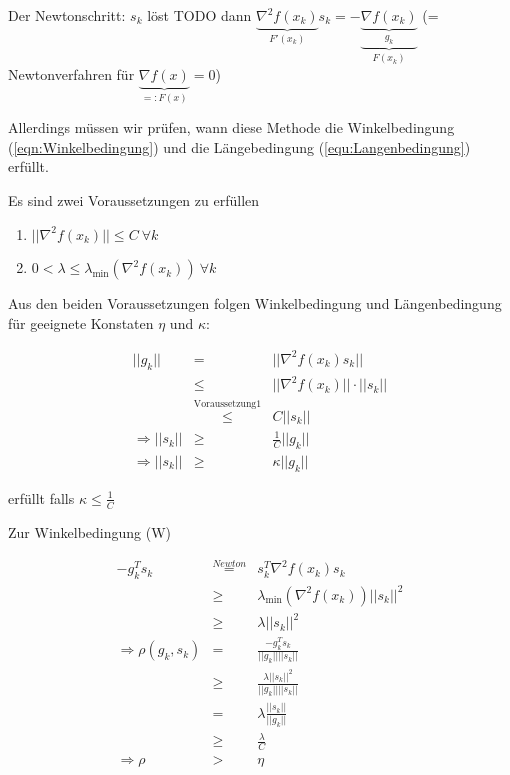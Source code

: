 \documentclass[10pt,a4paper]{article}
\begin{document}




Der Newtonschritt: $s_k$ löst TODO dann $\underbrace{\nabla^{2}f(x_k)}_{F'(x_k)}s_k=-\underbrace{\underbrace{\nabla f(x_k)}_{g_k}}_{F(x_k)}$ (= Newtonverfahren für $\underbrace{\nabla f(x)}_{=:F(x)}=0$)

Allerdings müssen wir prüfen, wann diese Methode die Winkelbedingung (\ref{eqn:Winkelbedingung}) und die Längebedingung (\ref{equ:Langenbedingung}) erfüllt.

Es sind zwei Voraussetzungen zu erfüllen 
\begin{enumerate}
\item $||\nabla^{2} f(x_k)|| \leq C ~ \forall k$
\item $0 < \lambda \leq \lambda_{\min} (\nabla^{2}f(x_k)) ~ \forall k$ 
\end{enumerate}



Aus den beiden Voraussetzungen folgen Winkelbedingung und Längenbedingung für geeignete Konstaten $\eta$ und $\kappa$: 

\begin{eqnarray}
||g_k||&=&||\nabla^{2} f(x_k) s_k|| \\
&\leq & ||\nabla^{2} f(x_k)|| \cdot ||s_k|| \\
&\stackrel{\text{Voraussetzung} 1}{\leq}& C ||s_k|| \\
\Rightarrow ||s_k|| &\geq & \frac{1}{C} ||g_k|| \\
\Rightarrow ||s_k|| &\geq & \kappa ||g_k||
\end{eqnarray}

 erfüllt falls $\kappa \leq \frac{1}{C}$

Zur Winkelbedingung (W)


\begin{eqnarray*}
-g_k^{T}s_k &\stackrel{Newton}{=}& s_k^{T}\nabla^{2}f(x_k)s_k \\
&\geq& \lambda_{\min} (\nabla^{2}f(x_k))||s_k||^{2} \\
&\geq& \lambda ||s_k||^{2} \\
\Rightarrow \rho(g_k,s_k)&=&\frac{-g_k^{T}s_k}{||g_k||||s_k||} \\
&\geq& \frac{\lambda ||s_k||^{2}}{||g_k||||s_k||} \\
&=& \lambda \frac{||s_k||}{||g_k||} \\
&\geq& \frac{\lambda}{C} \\
\Rightarrow \rho &>& \eta
\end{eqnarray*}
\end{document}
